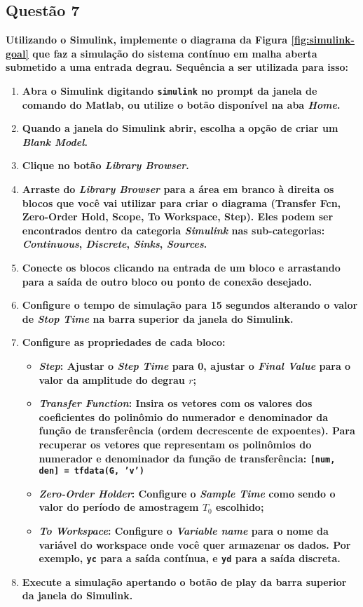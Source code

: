 \subsection{Questão 7}
\textbf{Utilizando o Simulink, implemente o diagrama da Figura \ref{fig:simulink-goal} que faz a simulação do sistema contínuo em malha aberta submetido a uma entrada degrau. Sequência a ser utilizada para isso:}
\begin{enumerate}
    \item \textbf{Abra o Simulink digitando \texttt{simulink} no prompt da janela de comando do Matlab, ou utilize o botão disponível na aba \textit{Home}.}
    \item \textbf{Quando a janela do Simulink abrir, escolha a opção de criar um \textit{Blank Model}.}
    \item \textbf{Clique no botão \textit{Library Browser}.}
    \item \textbf{Arraste do \textit{Library Browser} para a área em branco à direita os blocos que você vai utilizar para criar o diagrama (Transfer Fcn, Zero-Order Hold, Scope, To Workspace, Step). Eles podem ser encontrados dentro da categoria \textit{Simulink} nas sub-categorias: \textit{Continuous}, \textit{Discrete}, \textit{Sinks}, \textit{Sources}.}
    \item \textbf{Conecte os blocos clicando na entrada de um bloco e arrastando para a saída de outro bloco ou ponto de conexão desejado.}
    \item \textbf{Configure o tempo de simulação para 15 segundos alterando o valor de \textit{Stop Time} na barra superior da janela do Simulink.}
    \item \textbf{Configure as propriedades de cada bloco:}
    \begin{itemize}
        \item \textbf{\textit{Step}: Ajustar o \textit{Step Time} para 0, ajustar o \textit{Final Value} para o valor da amplitude do degrau \( r \);}
        \item \textbf{\textit{Transfer Function}: Insira os vetores com os valores dos coeficientes do polinômio do numerador e denominador da função de transferência (ordem decrescente de expoentes). Para recuperar os vetores que representam os polinômios do numerador e denominador da função de transferência:
        \texttt{[num, den] = tfdata(G, 'v')}
        }
        \item \textbf{\textit{Zero-Order Holder}: Configure o \textit{Sample Time} como sendo o valor do período de amostragem \( T_0 \) escolhido;}
        \item \textbf{\textit{To Workspace}: Configure o \textit{Variable name} para o nome da variável do workspace onde você quer armazenar os dados. Por exemplo, \texttt{yc} para a saída contínua, e \texttt{yd} para a saída discreta.}
    \end{itemize}
    \item \textbf{Execute a simulação apertando o botão de play da barra superior da janela do Simulink.}
\end{enumerate}


